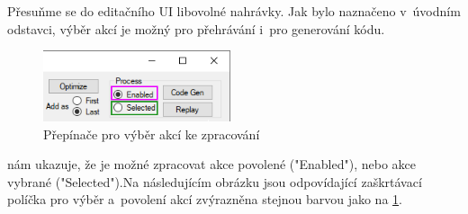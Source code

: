 \documentclass[12pt, a4paper, twoside]{article}
\begin{document}
	Přesuňme se do editačního UI libovolné nahrávky. Jak bylo naznačeno v~úvodním odstavci, výběr akcí je možný pro přehrávání i~pro generování kódu. 
	\begin{figure}[H]
		\centering
		\includegraphics[width=0.49\textwidth]{actionsToProcess.png}
		\caption{Přepínače pro výběr akcí ke zpracování}
		\label{fig:processType}
	\end{figure}	
	 nám ukazuje, že je možné zpracovat akce povolené ("Enabled"), nebo akce vybrané ("Selected").\newpage Na následujícím obrázku jsou odpovídající zaškrtávací políčka pro výběr a~povolení akcí zvýrazněna stejnou barvou jako na \cref{fig:processType}.
\end{document}
